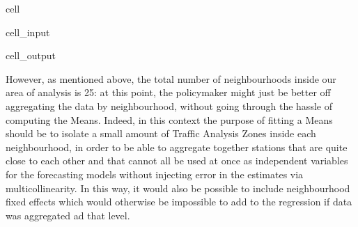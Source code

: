 \documentclass[letterpaper,10pt,english]{jupyterBook}
\begin{document}
\begin{sphinxuseclass}{cell}
\begin{sphinxuseclass}{cell_input}
\begin{sphinxVerbatim}[commandchars=\\\{\}]
         
          


    

\end{sphinxVerbatim}

\end{sphinxuseclass}
\begin{sphinxuseclass}{cell_output}
\noindent{}

\end{sphinxuseclass}
\end{sphinxuseclass}
\sphinxAtStartPar
However, as mentioned above, the total number of neighbourhoods inside our area of analysis is 25: at this point, the policymaker might just be better off aggregating the data by neighbourhood, without going through the hassle of computing the \sphinxhyphen{}Means. Indeed, in this context the purpose of fitting a \sphinxhyphen{}Means should be to isolate a small amount of Traffic Analysis Zones inside each neighbourhood, in order to be able to aggregate together stations that are quite close to each other and that cannot all be used at once as independent variables for the forecasting models without injecting error in the estimates via multicollinearity. In this way, it would also be possible to include neighbourhood fixed effects \sphinxhyphen{} which would otherwise be impossible to add to the regression if data was aggregated ad that level.
\end{document}
